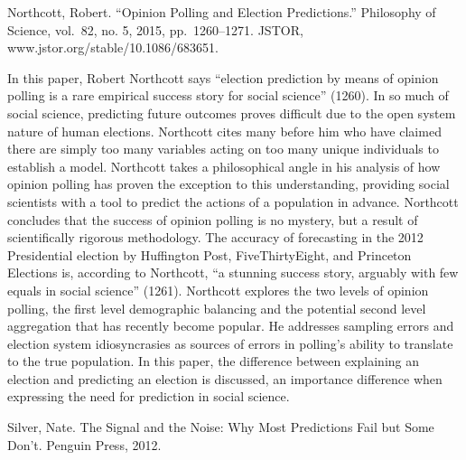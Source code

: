 \documentclass[]{article}
\begin{document}
Northcott, Robert. ``Opinion Polling and Election Predictions.''
Philosophy of Science, vol.~82, no. 5, 2015, pp.~1260--1271. JSTOR,
www.jstor.org/stable/10.1086/683651.

In this paper, Robert Northcott says ``election prediction by means of
opinion polling is a rare empirical success story for social science''
(1260). In so much of social science, predicting future outcomes proves
difficult due to the open system nature of human elections. Northcott
cites many before him who have claimed there are simply too many
variables acting on too many unique individuals to establish a model.
Northcott takes a philosophical angle in his analysis of how opinion
polling has proven the exception to this understanding, providing social
scientists with a tool to predict the actions of a population in
advance. Northcott concludes that the success of opinion polling is no
mystery, but a result of scientifically rigorous methodology. The
accuracy of forecasting in the 2012 Presidential election by Huffington
Post, FiveThirtyEight, and Princeton Elections is, according to
Northcott, ``a stunning success story, arguably with few equals in
social science'' (1261). Northcott explores the two levels of opinion
polling, the first level demographic balancing and the potential second
level aggregation that has recently become popular. He addresses
sampling errors and election system idiosyncrasies as sources of errors
in polling's ability to translate to the true population. In this paper,
the difference between explaining an election and predicting an election
is discussed, an importance difference when expressing the need for
prediction in social science.

Silver, Nate. The Signal and the Noise: Why Most Predictions Fail but
Some Don't. Penguin Press, 2012.
\end{document}
